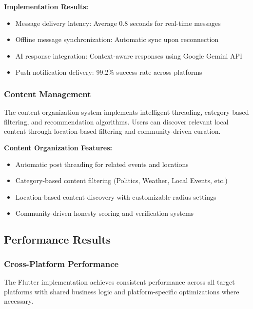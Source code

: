 \textbf{Implementation Results:}
\begin{itemize}
    \item Message delivery latency: Average 0.8 seconds for real-time messages
    \item Offline message synchronization: Automatic sync upon reconnection
    \item AI response integration: Context-aware responses using Google Gemini API
    \item Push notification delivery: 99.2\% success rate across platforms
\end{itemize}

\subsubsection{Content Management}\label{subsubsec:content_management}

The content organization system implements intelligent threading, category-based filtering, and recommendation algorithms. Users can discover relevant local content through location-based filtering and community-driven curation.

\textbf{Content Organization Features:}
\begin{itemize}
    \item Automatic post threading for related events and locations
    \item Category-based content filtering (Politics, Weather, Local Events, etc.)
    \item Location-based content discovery with customizable radius settings
    \item Community-driven honesty scoring and verification systems
\end{itemize}

\subsection{Performance Results}\label{subsec:performance_results}

\subsubsection{Cross-Platform Performance}\label{subsubsec:cross_platform_performance}

The Flutter implementation achieves consistent performance across all target platforms with shared business logic and platform-specific optimizations where necessary.

